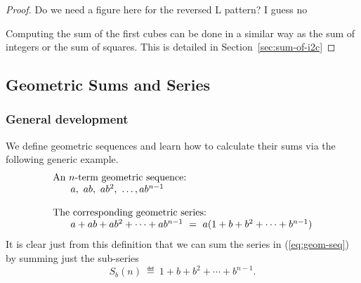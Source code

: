 \begin{proof}
{\Denis Do we need a figure here for the reversed L pattern? I guess no}


%

\medskip

Computing the sum of the first cubes can be done in a similar way as the sum of integers or the sum of squares.
This is detailed in Section~\ref{sec:sum-of-i2c}
\end{proof}


\subsection{Geometric Sums and Series}
\label{sec:geometric-sums}


\subsubsection{General development}
\label{sec:general-geometric}

We define geometric sequences and learn how to calculate their sums
via the following generic example.
\begin{equation}
\label{eq:geom-seq}
\begin{array}{l}
\mbox{An $n$-term geometric sequence:} \\
\hspace*{.25in}a, \ ab, \ ab^2, \ \ldots, ab^{n-1} \\
 \\
\mbox{The corresponding geometric series:} \\
\hspace*{.25in}a + ab + ab^2 + \cdots + ab^{n-1} \ = \
 a (1+ b + b^2 + \cdots + b^{n-1})
\end{array}
\end{equation}
It is clear just from this definition that we can sum the series in
(\ref{eq:geom-seq}) by summing just the sub-series
\begin{equation}
\label{eq:geom-series}
S_{b}(n) \ \eqdef \
1+ b + b^2 + \cdots + b^{n-1}.
\end{equation}

